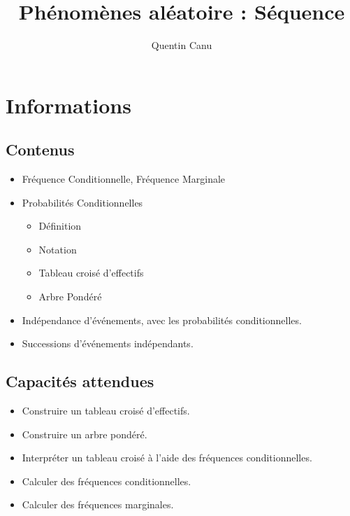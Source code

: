 \documentclass{article}
\title{Phénomènes aléatoire : Séquence}
\date{}
\author{Quentin Canu}
\begin{document}
\maketitle
\section{Informations}
\subsection{Contenus}
\begin{itemize}
\item Fréquence Conditionnelle, Fréquence Marginale
\item Probabilités Conditionnelles
    \begin{itemize}
    \item Définition
    \item Notation
    \item Tableau croisé d'effectifs
    \item Arbre Pondéré 
    \end{itemize}
\item Indépendance d'événements, avec les probabilités conditionnelles.
\item Successions d'événements indépendants.
\end{itemize}
\subsection{Capacités attendues}
\begin{itemize}
\item Construire un tableau croisé d'effectifs.
\item Construire un arbre pondéré.
\item Interpréter un tableau croisé à l'aide des fréquences conditionnelles.
\item Calculer des fréquences conditionnelles. 
\item Calculer des fréquences marginales. 
\end{itemize}
\end{document}
